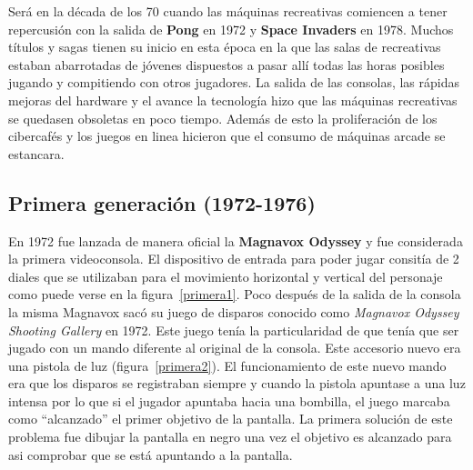 Ser\'a en la d\'ecada de los 70 cuando las m\'aquinas recreativas comiencen a tener repercusi\'on con la salida de \textbf{Pong} en 1972 y \textbf{Space Invaders} en 1978. Muchos t\'itulos y sagas tienen su inicio en esta \'epoca en la que las salas de recreativas estaban abarrotadas de j\'ovenes dispuestos a pasar all\'i todas las horas posibles jugando y compitiendo con otros jugadores. La salida de las consolas, las r\'apidas mejoras del hardware y el avance la tecnolog\'ia hizo que las m\'aquinas recreativas se quedasen obsoletas en poco tiempo. Adem\'as de esto la proliferaci\'on de los cibercaf\'es y los juegos en linea hicieron que el consumo de m\'aquinas arcade se estancara. \\

\subsection{Primera generaci\'on (1972-1976)}


En 1972 fue lanzada de manera oficial la \textbf{Magnavox Odyssey} y fue considerada la primera videoconsola. El dispositivo de entrada para poder jugar consit\'ia de 2 diales que se utilizaban para el movimiento horizontal y vertical del personaje como puede verse en la figura~\ref{primera1}. Poco despu\'es de la salida de la consola la misma Magnavox sac\'o su juego de disparos conocido como \textit{Magnavox Odyssey Shooting Gallery} en 1972. Este juego ten\'ia la particularidad de que ten\'ia que ser jugado con un mando diferente al original de la consola. Este accesorio nuevo era una pistola de luz (figura~\ref{primera2}). El funcionamiento de este nuevo mando era que los disparos se registraban siempre y cuando la pistola apuntase a una luz intensa por lo que si el jugador apuntaba hacia una bombilla, el juego marcaba como ``alcanzado'' el primer objetivo de la pantalla. La primera soluci\'on de este problema fue dibujar la pantalla en negro una vez el objetivo es alcanzado para asi comprobar que se est\'a apuntando a la pantalla. \\

